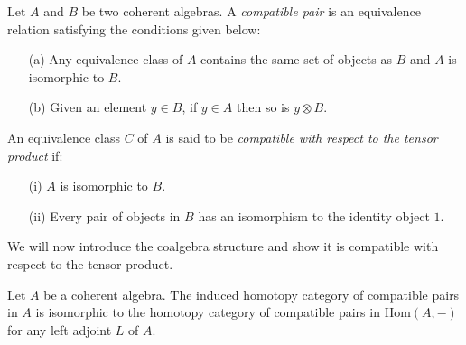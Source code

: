 \documentclass[a4paper,reqno,oneside]{article}
\begin{document}
\begin{definition}
    Let $A$ and $B$ be two coherent algebras. A \textit{compatible pair} is an equivalence relation satisfying the conditions given below: 
    \begin{enumerate}[leftmargin=*]
        \item[(a)] Any equivalence class of $A$ contains the same set of objects as $B$ and $A$ is isomorphic to $B$.
        \item[(b)] Given an element $y \in B$, if $y \in A$ then so is $y \otimes B$.
    \end{enumerate}
    
    An equivalence class $C$ of $A$ is said to be \textit{compatible with respect to the tensor product} if:
    \begin{enumerate}[leftmargin=*]
        \item[(i)] $A$ is isomorphic to $B$.
        \item[(ii)] Every pair of objects in $B$ has an isomorphism to the identity object $1$.
    \end{enumerate}
\end{definition}

We will now introduce the coalgebra structure and show it is compatible with respect to the tensor product.

\begin{lemma}[Completeness]
    Let $A$ be a coherent algebra. The induced homotopy category of compatible pairs in $A$ is isomorphic to the homotopy category of compatible pairs in $\mathrm{Hom}(A,-)$ for any left adjoint $L$ of $A$. 
\end{lemma}
\end{document}

